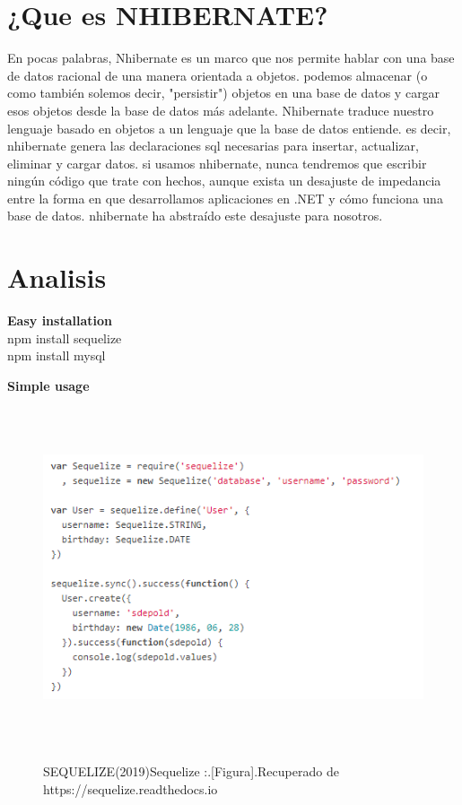 \documentclass[preprint,12pt]{elsarticle}
\begin{document}
\section{¿Que es NHIBERNATE?}
En pocas palabras, Nhibernate es un marco que nos permite hablar con una base de datos racional de una manera orientada a objetos. podemos almacenar (o como también solemos decir, "persistir") objetos en una base de datos y cargar esos objetos desde la base de datos más adelante. Nhibernate traduce nuestro lenguaje basado en objetos a un lenguaje que la base de datos entiende. es decir, nhibernate genera las declaraciones sql necesarias para insertar, actualizar, eliminar y cargar datos.
si usamos nhibernate, nunca tendremos que escribir ningún código que trate con hechos, aunque exista un desajuste de impedancia entre la forma en que desarrollamos aplicaciones en .NET y cómo funciona una base de datos. nhibernate ha abstraído este desajuste para nosotros. \citep {referencia07}

\section{Analisis}
{\bf {Easy installation}}
\\
 npm install sequelize\\
 npm install mysql

{\bf {Simple usage}}

\begin{figure}[H]
			\begin{center}
					\includegraphics[width=14cm,height=10cm]{./IMAGENES/codigo}
			\end{center}
			SEQUELIZE(2019)Sequelize :.[Figura].Recuperado de 
			https://sequelize.readthedocs.io
		\end{figure}
\end{document}
